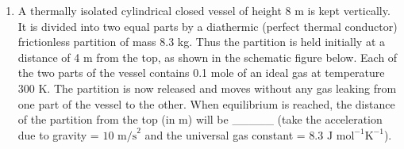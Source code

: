 
\begin{enumerate}
    \item A thermally isolated cylindrical closed vessel of height 8 m is kept vertically. It is divided into two equal parts by a diathermic (perfect thermal conductor) frictionless partition of mass 8.3 kg. Thus the partition is held initially at a distance of 4 m from the top, as shown in the schematic figure below. Each of the two parts of the vessel contains 0.1 mole of an ideal gas at temperature 300 K. The partition is now released and moves without any gas leaking from one part of the vessel to the other. When equilibrium is reached, the distance of the partition from the top (in m) will be \_\_\_\_\_ (take the acceleration due to gravity = \(10 \text{ m/s}^2\) and the universal gas constant = \(8.3 \text{ J mol}^{-1}\text{K}^{-1}\)).
\end{enumerate}

\begin{center}
\end{center}
